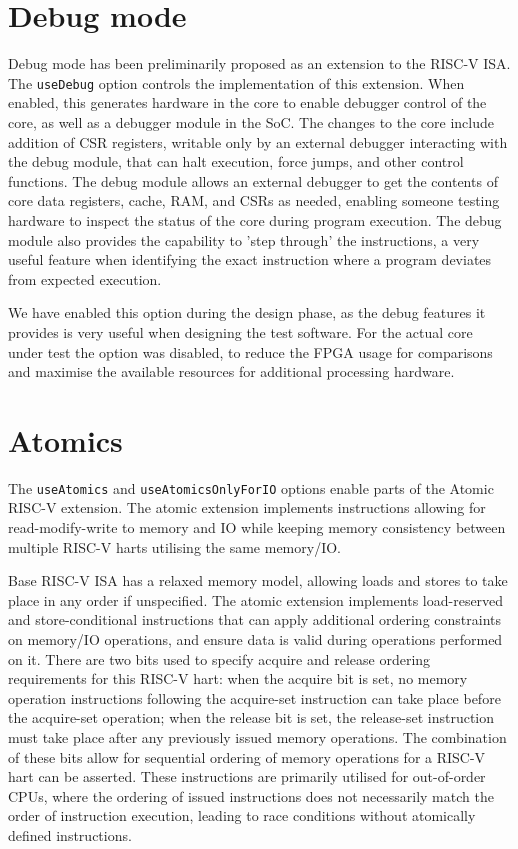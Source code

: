 \section{Debug mode}
Debug mode has been preliminarily proposed as an extension to the RISC-V ISA. The \texttt{useDebug} option controls the implementation of this extension. When enabled, this generates hardware in the core to enable debugger control of the core, as well as a debugger module in the SoC. The changes to the core include addition of CSR registers, writable only by an external debugger interacting with the debug module, that can halt execution, force jumps, and other control functions. The debug module allows an external debugger to get the contents of core data registers, cache, RAM, and CSRs as needed, enabling someone testing hardware to inspect the status of the core during program execution. The debug module also provides the capability to 'step through' the instructions, a very useful feature when identifying the exact instruction where a program deviates from expected execution.

We have enabled this option during the design phase, as the debug features it provides is very useful when designing the test software. For the actual core under test the option was disabled, to reduce the FPGA usage for comparisons and maximise the available resources for additional processing hardware.

\section{Atomics}
The \texttt{useAtomics} and \texttt{useAtomicsOnlyForIO} options enable parts of the Atomic RISC-V extension. The atomic extension implements instructions allowing for read-modify-write to memory and IO while keeping memory consistency between multiple RISC-V harts utilising the same memory/IO.

Base RISC-V ISA has a relaxed memory model, allowing loads and stores to take place in any order if unspecified. The atomic extension implements load-reserved and store-conditional instructions that can apply additional ordering constraints on memory/IO operations, and ensure data is valid during operations performed on it. There are two bits used to specify acquire and release ordering requirements for this RISC-V hart: when the acquire bit is set, no memory operation instructions following the acquire-set instruction can take place before the acquire-set operation; when the release bit is set, the release-set instruction must take place after any previously issued memory operations. The combination of these bits allow for sequential ordering of memory operations for a RISC-V hart can be asserted. These instructions are primarily utilised for out-of-order CPUs, where the ordering of issued instructions does not necessarily match the order of instruction execution, leading to race conditions without atomically defined instructions.

